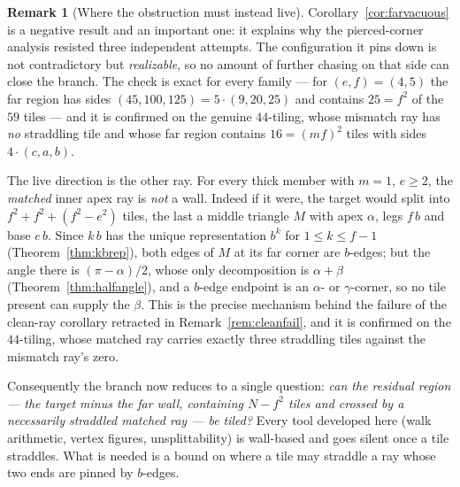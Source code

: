 \documentclass[11pt,reqno]{amsart}
\theoremstyle{plain}
\theoremstyle{definition}
\newtheorem{remark}[theorem]{Remark}
\begin{document}
\begin{remark}[Where the obstruction must instead live]\label{rem:live}
Corollary~\ref{cor:farvacuous} is a negative result and an important one: it explains why the
pierced-corner analysis resisted three independent attempts. The configuration it pins down is not
contradictory but \emph{realizable}, so no amount of further chasing on that side can close the
branch. The check is exact for every family --- for $(e,f)=(4,5)$ the far region has sides
$(45,100,125)=5\cdot(9,20,25)$ and contains $25=f^2$ of the $59$ tiles --- and it is confirmed on the
genuine $44$-tiling, whose mismatch ray has \emph{no} straddling tile and whose far region contains
$16=(mf)^2$ tiles with sides $4\cdot(c,a,b)$.

The live direction is the other ray. For every thick member with $m=1$, $e\ge2$, the \emph{matched}
inner apex ray is \emph{not} a wall. Indeed if it were, the target would split into $f^2+f^2+(f^2-e^2)$
tiles, the last a middle triangle $M$ with apex $\alpha$, legs $f\,b$ and base $e\,b$. Since $k\,b$
has the unique representation $b^{k}$ for $1\le k\le f-1$ (Theorem~\ref{thm:kbrep}), both edges of $M$
at its far corner are $b$-edges; but the angle there is $(\pi-\alpha)/2$, whose only decomposition is
$\alpha+\beta$ (Theorem~\ref{thm:halfangle}), and a $b$-edge endpoint is an $\alpha$- or
$\gamma$-corner, so no tile present can supply the $\beta$. This is the precise mechanism behind the
failure of the clean-ray corollary retracted in Remark~\ref{rem:cleanfail}, and it is confirmed on the
$44$-tiling, whose matched ray carries exactly three straddling tiles against the mismatch ray's zero.

Consequently the branch now reduces to a single question: \emph{can the residual region --- the
target minus the far wall, containing $N-f^2$ tiles and crossed by a necessarily straddled matched
ray --- be tiled?} Every tool developed here (walk arithmetic, vertex figures, unsplittability) is
wall-based and goes silent once a tile straddles. What is needed is a bound on where a tile may
straddle a ray whose two ends are pinned by $b$-edges.
\end{remark}
\end{document}
